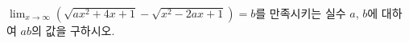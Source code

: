 $\displaystyle\lim_{x\to\infty}(\sqrt{ax^2+4x+1}-\sqrt{x^2-2ax+1})=b$를 만족시키는 실수 $a$, $b$에 대하여 $ab$의 값을 구하시오.

